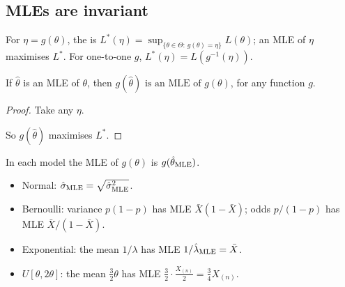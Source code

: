 \subsection*{MLEs are invariant}

\begin{definition}
For $\eta=g(\theta)$, the  is $L^*(\eta)=\sup_{\{\theta\in\Theta:\,g(\theta)=\eta\}}L(\theta)$; an MLE of $\eta$ maximises $L^*$. For one-to-one $g$, $L^*(\eta)=L(g^{-1}(\eta))$.
\end{definition}

\begin{theorem}
If $\hat\theta$ is an MLE of $\theta$, then $\boxed{g(\hat\theta)\text{ is an MLE of }g(\theta)}$, for any function $g$.
\end{theorem}
\begin{proof}
Take any $\eta$.
\begin{deriv}
\end{deriv}
So $g(\hat\theta)$ maximises $L^*$.
\end{proof}

\begin{example}
In each model the MLE of $g(\theta)$ is $g(\hat\theta_{\mathrm{MLE}})$.
\begin{itemize}
  \item Normal: $\hat\sigma_{\mathrm{MLE}}=\sqrt{\hat\sigma^2_{\mathrm{MLE}}}$.
  \item Bernoulli: variance $p(1-p)$ has MLE $\bar X(1-\bar X)$; odds $p/(1-p)$ has MLE $\bar X/(1-\bar X)$.
  \item Exponential: the mean $1/\lambda$ has MLE $1/\hat\lambda_{\mathrm{MLE}}=\bar X$.
  \item $U[\theta,2\theta]$: the mean $\frac32\theta$ has MLE $\frac32\cdot\frac{X_{(n)}}{2}=\frac34X_{(n)}$.
\end{itemize}
\end{example}
